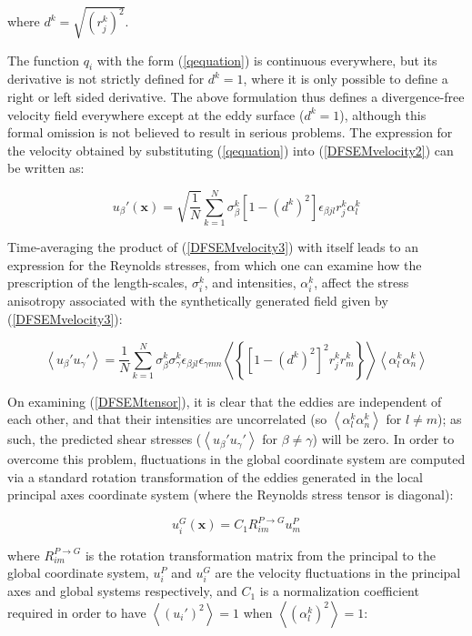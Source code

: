 \noindent where $d^k = \sqrt{(r_j^k)^2}$.

The function $q_i$ with the form (\ref{qequation}) is continuous everywhere, but its derivative is not strictly defined for $d^k=1$, where it is only possible to define a right or left sided derivative. The above formulation thus defines a divergence-free velocity field everywhere except at the eddy surface ($d^k=1$), although this formal omission is not believed to result in serious problems. The expression for the velocity obtained by substituting (\ref{qequation}) into (\ref{DFSEMvelocity2}) can be written as:

\begin{equation} \label{DFSEMvelocity3}
	u_{\beta}'(\boldsymbol{x}) = \sqrt{\frac{1}{N}}\sum_{k=1}^N \sigma_{\beta}^k\left[1-(d^k)^2\right] \epsilon_{\beta j l}r_j^k \alpha_l^k
\end{equation}

\noindent Time-averaging the product of (\ref{DFSEMvelocity3}) with itself leads to an expression for the Reynolds stresses, from which one can examine how the prescription of the length-scales, $\sigma_i^k$, and intensities, $\alpha_i^k$, affect the stress anisotropy associated with the synthetically generated field given by (\ref{DFSEMvelocity3}):

\begin{equation} \label{DFSEMtensor}
	\left<u_{\beta}'u_{\gamma}'\right> = \frac{1}{N}\sum_{k=1}^N\sigma_{\beta}^k\sigma_{\gamma}^k \epsilon_{\beta j l} \epsilon_{\gamma m n}\left<\left\{\left[1-(d^k)^2\right]^2r_j^kr_m^k \right\}\right>\left<\alpha_l^k\alpha_n^k\right>
\end{equation}

\noindent On examining (\ref{DFSEMtensor}), it is clear that the eddies are independent of each other, and that their intensities are uncorrelated (so $\left<\alpha_l^k\alpha_n^k\right>$ for $l \neq m$); as such, the predicted shear stresses ($\left<u_{\beta}'u_{\gamma}'\right>$ for $\beta\neq\gamma$) will be zero. In order to overcome this problem, fluctuations in the global coordinate system are computed via a standard rotation transformation of the eddies generated in the local principal axes coordinate system (where the Reynolds stress tensor is diagonal):

\begin{equation}
	u_i^{G}(\boldsymbol{x}) = C_1 R_{im}^{P\rightarrow G}u_m^P
\end{equation}

\noindent where $R_{im}^{P\rightarrow G}$ is the rotation transformation matrix from the principal to the global coordinate system, $u_i^{P}$ and $u_i^{G}$ are the velocity fluctuations in the principal axes and global systems respectively, and $C_1$ is a normalization coefficient required in order to have $\left<(u_i')^2\right>=1$ when $\left<(\alpha_l^k)^2\right>=1$:

